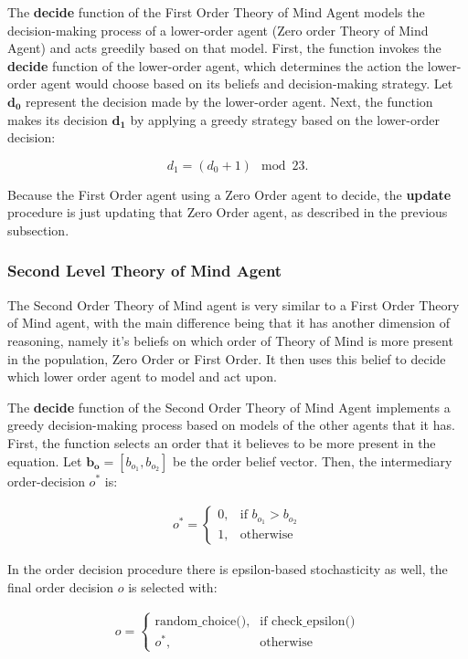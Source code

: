 The \textbf{decide} function of the First Order Theory of Mind Agent models the decision-making process of a lower-order agent (Zero order Theory of Mind Agent) and acts greedily based on that model. First, the function invokes the \textbf{decide} function of the lower-order agent, which determines the action the lower-order agent would choose based on its beliefs and decision-making strategy. Let $\mathbf{d_0}$ represent the decision made by the lower-order agent. Next, the function makes its decision $\mathbf{d_1}$ by applying a greedy strategy based on the lower-order decision:

\[
d_1 = (d_0 + 1) \mod 23.
\]

Because the First Order agent using a Zero Order agent to decide, the \textbf{update} procedure is just updating that Zero Order agent, as described in the previous subsection.

\subsubsection{Second Level Theory of Mind Agent}

The Second Order Theory of Mind agent is very similar to a First Order Theory of Mind agent, with the main difference being that it has another dimension of reasoning, namely it's beliefs on which order of Theory of Mind is more present in the population, Zero Order or First Order. It then uses this belief to decide which lower order agent to model and act upon. 

The \textbf{decide} function of the Second Order Theory of Mind Agent implements a greedy decision-making process based on models of the other agents that it has. First, the function selects an order that it believes to be more present in the equation. Let $\mathbf{b_o} = [b_{o_{1}}, b_{o_{2}}]$ be the order belief vector. Then, the intermediary order-decision $o^*$ is:

\[
\begin{aligned}
\text{{$o^*$}} =
\begin{cases}
0, & \text{{if }} b_{o_{1}} > b_{o_{2}}\\
1, & \text{{otherwise}}
\end{cases}
\end{aligned}
\]

In the order decision procedure there is epsilon-based stochasticity as well, the final order decision $o$ is selected with:

\[
\begin{aligned}
\text{{$o$}} =
\begin{cases}
\text{{random\_choice()}}, & \text{{if }} \text{{check\_epsilon()}} \\
o^*, & \text{{otherwise}}
\end{cases}
\end{aligned}
\]

